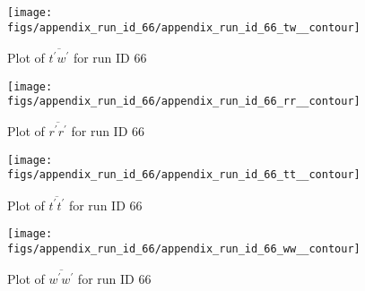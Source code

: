 \begin{figure}[H]
\centering
\texttt{[image: figs/appendix\_run\_id\_66/appendix\_run\_id\_66\_tw\_\_contour]}
\caption{Plot of $\overline{t^\prime w^\prime}$ for run ID 66}
\label{fig:appendix_run_id_66_tw__contour}
\end{figure}


\begin{figure}[H]
\centering
\texttt{[image: figs/appendix\_run\_id\_66/appendix\_run\_id\_66\_rr\_\_contour]}
\caption{Plot of $\overline{r^\prime r^\prime}$ for run ID 66}
\label{fig:appendix_run_id_66_rr__contour}
\end{figure}


\begin{figure}[H]
\centering
\texttt{[image: figs/appendix\_run\_id\_66/appendix\_run\_id\_66\_tt\_\_contour]}
\caption{Plot of $\overline{t^\prime t^\prime}$ for run ID 66}
\label{fig:appendix_run_id_66_tt__contour}
\end{figure}


\begin{figure}[H]
\centering
\texttt{[image: figs/appendix\_run\_id\_66/appendix\_run\_id\_66\_ww\_\_contour]}
\caption{Plot of $\overline{w^\prime w^\prime}$ for run ID 66}
\label{fig:appendix_run_id_66_ww__contour}
\end{figure}


